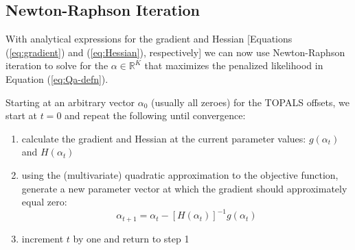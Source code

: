 \documentclass{article}
\begin{document}
\newpage
\subsection{Newton-Raphson Iteration}

With analytical expressions for the gradient and Hessian [Equations (\ref{eq:gradient}) and (\ref{eq:Hessian}), respectively] we can now use Newton-Raphson iteration to solve for the $\alpha \in \mathbb{R}^K$ that maximizes the penalized likelihood in Equation (\ref{eq:Qa-defn}).

Starting at an arbitrary vector $\alpha_0$ (usually all zeroes) for the TOPALS offsets, we start at $t=0$ and repeat the following until convergence: 
\begin{enumerate}
    \item calculate the gradient and Hessian at the current parameter values: $g(\alpha_t)$ and $H(\alpha_t)$ 
\item using the (multivariate) quadratic approximation to the objective function, generate a new parameter vector at which the gradient should approximately equal zero:
$$
\alpha_{t+1} = \alpha_t - [H(\alpha_t)]^{-1} g(\alpha_t)
$$
\item increment $t$ by one and return to step 1
\end{enumerate}
\end{document}
